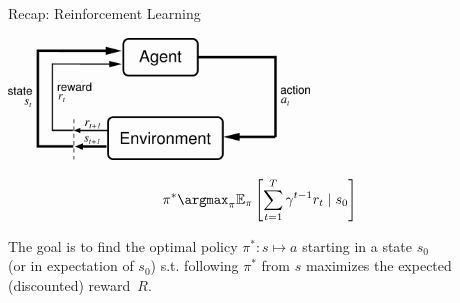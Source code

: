 \begin{frame}[c]{Recap: Reinforcement Learning }

\begin{center}
\includegraphics[width=0.6\textwidth]{images/suttonbarto_rl.png}
\end{center}

\pause

\begin{eqnarray}
\pi^* \argmax_{\pi} \mathbb{E}_{\pi} \left[ \sum^{T}_{t=1} \gamma^{t-1} r_t \mid s_0 \right] \nonumber
\end{eqnarray}

The goal is to find the optimal policy $\pi^{*}: s \mapsto a$ starting in a state $s_0$\\ (or in expectation of $s_0$) s.t. following $\pi^{*}$ from $s$ maximizes the expected (discounted) reward~$R$.


\end{frame}
